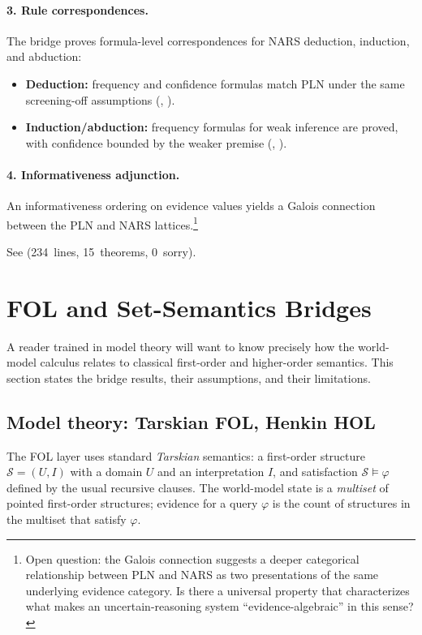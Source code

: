 \documentclass[11pt,openany]{report}
\begin{document}
\paragraph{3. Rule correspondences.}
The bridge proves formula-level correspondences for NARS deduction,
induction, and abduction:
\begin{itemize}
\item \textbf{Deduction:} frequency and confidence formulas match
  PLN under the same screening-off assumptions
  (, ).
\item \textbf{Induction/abduction:} frequency formulas for weak
  inference are proved, with confidence bounded by the weaker
  premise (, ).
\end{itemize}

\paragraph{4. Informativeness adjunction.}
An informativeness ordering on evidence values yields a Galois
connection between the PLN and NARS lattices.\footnote{Open question:
the Galois connection suggests a deeper categorical relationship
between PLN and NARS as two presentations of the same underlying
evidence category.  Is there a universal property that characterizes
what makes an uncertain-reasoning system ``evidence-algebraic'' in
this sense?}

See  (234~lines,
15~theorems, 0~sorry).


\section{FOL and Set-Semantics Bridges}
\label{sec:fol-set-bridge}

A reader trained in model theory will want to know precisely how
the world-model calculus relates to classical first-order and
higher-order semantics.  This section states the bridge results,
their assumptions, and their limitations.

\subsection{Model theory: Tarskian FOL, Henkin HOL}

The FOL layer uses standard \emph{Tarskian} semantics: a first-order
structure $\mathcal{S} = (U, I)$ with a domain $U$ and an
interpretation $I$, and satisfaction $\mathcal{S} \models \varphi$
defined by the usual recursive clauses.  The world-model state is a
\emph{multiset} of pointed first-order structures; evidence for a
query $\varphi$ is the count of structures in the multiset that
satisfy $\varphi$.
\end{document}
